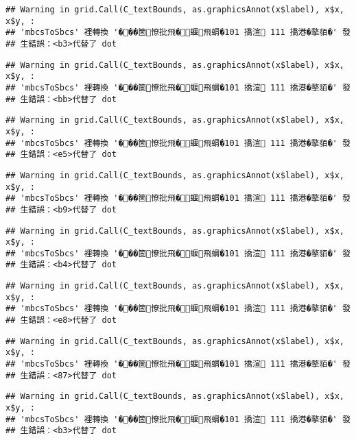 \documentclass[
]{article}
\begin{document}
\begin{verbatim}
## Warning in grid.Call(C_textBounds, as.graphicsAnnot(x$label), x$x, x$y, :
## 'mbcsToSbcs' 裡轉換 '���箇憭批飛�蝘飛蝟�101 撟渲 111 撟港�摮貊�' 發
## 生錯誤：<b3>代替了 dot
\end{verbatim}

\begin{verbatim}
## Warning in grid.Call(C_textBounds, as.graphicsAnnot(x$label), x$x, x$y, :
## 'mbcsToSbcs' 裡轉換 '���箇憭批飛�蝘飛蝟�101 撟渲 111 撟港�摮貊�' 發
## 生錯誤：<bb>代替了 dot
\end{verbatim}

\begin{verbatim}
## Warning in grid.Call(C_textBounds, as.graphicsAnnot(x$label), x$x, x$y, :
## 'mbcsToSbcs' 裡轉換 '���箇憭批飛�蝘飛蝟�101 撟渲 111 撟港�摮貊�' 發
## 生錯誤：<e5>代替了 dot
\end{verbatim}

\begin{verbatim}
## Warning in grid.Call(C_textBounds, as.graphicsAnnot(x$label), x$x, x$y, :
## 'mbcsToSbcs' 裡轉換 '���箇憭批飛�蝘飛蝟�101 撟渲 111 撟港�摮貊�' 發
## 生錯誤：<b9>代替了 dot
\end{verbatim}

\begin{verbatim}
## Warning in grid.Call(C_textBounds, as.graphicsAnnot(x$label), x$x, x$y, :
## 'mbcsToSbcs' 裡轉換 '���箇憭批飛�蝘飛蝟�101 撟渲 111 撟港�摮貊�' 發
## 生錯誤：<b4>代替了 dot
\end{verbatim}

\begin{verbatim}
## Warning in grid.Call(C_textBounds, as.graphicsAnnot(x$label), x$x, x$y, :
## 'mbcsToSbcs' 裡轉換 '���箇憭批飛�蝘飛蝟�101 撟渲 111 撟港�摮貊�' 發
## 生錯誤：<e8>代替了 dot
\end{verbatim}

\begin{verbatim}
## Warning in grid.Call(C_textBounds, as.graphicsAnnot(x$label), x$x, x$y, :
## 'mbcsToSbcs' 裡轉換 '���箇憭批飛�蝘飛蝟�101 撟渲 111 撟港�摮貊�' 發
## 生錯誤：<87>代替了 dot
\end{verbatim}

\begin{verbatim}
## Warning in grid.Call(C_textBounds, as.graphicsAnnot(x$label), x$x, x$y, :
## 'mbcsToSbcs' 裡轉換 '���箇憭批飛�蝘飛蝟�101 撟渲 111 撟港�摮貊�' 發
## 生錯誤：<b3>代替了 dot
\end{verbatim}
\end{document}

